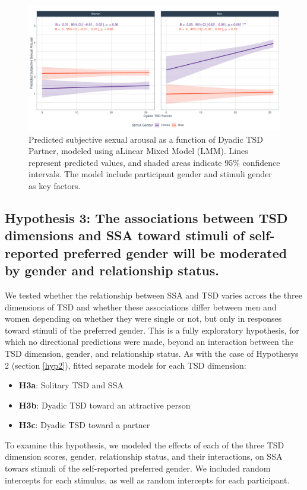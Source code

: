 \documentclass[
  bookmarksnumbered]{article}
\providecommand{\tightlist}{%
  \setlength{\itemsep}{0pt}\setlength{\parskip}{0pt}}
\begin{document}
\begin{figure}
\centering
\includegraphics{Sexual_Desire_Arousal_files/figure-latex/fig-h2c-1.pdf}
\caption{\label{fig:fig-h2c}Predicted subjective sexual arousal as a function of Dyadic TSD Partner, modeled using aLinear Mixed Model (LMM). Lines represent predicted values, and shaded areas indicate 95\% confidence intervals. The model include participant gender and stimuli gender as key factors.}
\end{figure}

\subsection{Hypothesis 3: The associations between TSD dimensions and SSA toward stimuli of self-reported preferred gender will be moderated by gender and relationship status.}\label{hyp3}

We tested whether the relationship between SSA and TSD varies across the three dimensions of TSD and whether these associations differ between men and women depending on whether they were single or not, but only in responses toward stimuli of the preferred gender. This is a fully exploratory hypothesis, for which no directional predictions were made, beyond an interaction between the TSD dimension, gender, and relationship status. As with the case of Hypothesys 2 (section \ref{hyp2}), fitted separate models for each TSD dimension:

\begin{itemize}
\tightlist
\item
  \textbf{H3a}: Solitary TSD and SSA
\item
  \textbf{H3b}: Dyadic TSD toward an attractive person
\item
  \textbf{H3c}: Dyadic TSD toward a partner
\end{itemize}

To examine this hypothesis, we modeled the effects of each of the three TSD dimension scores, gender, relationship status, and their interactions, on SSA towars stimuli of the self-reported preferred gender. We included random intercepts for each stimulus, as well as random intercepts for each participant.
\end{document}
